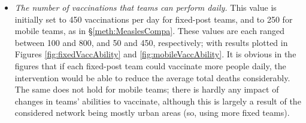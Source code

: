 \begin{itemize}
    \begin{table}[ht!]
    \centering
    \caption{Comparison of overlapping shifts against all teams having a common day off}
    \label{tab:shiftsVs6days}
    \end{table}
    
    \item \textit{The number of vaccinations that teams can perform daily.} This value is initially set to 450 vaccinations per day for fixed-post teams, and to 250 for mobile teams, as in \S \ref{meth:MeaslesCompa}. These values are each ranged between 100 and 800, and 50 and 450, respectively; with results plotted in Figures \ref{fig:fixedVaccAbility} and \ref{fig:mobileVaccAbility}. It is obvious in the figures that if each fixed-post team could vaccinate more people daily, the intervention would be able to reduce the average total deaths considerably. The same does not hold for mobile teams; there is hardly any impact of changes in teams' abilities to vaccinate, although this is largely a result of the considered network being mostly urban areas (so, using more fixed teams).
    

\end{itemize}
